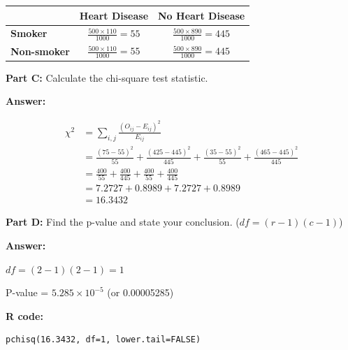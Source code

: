 \documentclass[11pt]{article}
\begin{document}
\vspace{0.3cm}

\begin{tabular}{l|cc}
& \textbf{Heart Disease} & \textbf{No Heart Disease} \\
\hline
\textbf{Smoker} & $\frac{500 \times 110}{1000} = 55$ & $\frac{500 \times 890}{1000} = 445$ \\[0.3cm]
\textbf{Non-smoker} & $\frac{500 \times 110}{1000} = 55$ & $\frac{500 \times 890}{1000} = 445$ \\
\end{tabular}

\vspace{1cm}

\textbf{Part C:} Calculate the chi-square test statistic.

\vspace{0.3cm}

\textbf{Answer:}

\begin{align*}
\chi^2 &= \sum_{i,j} \frac{(O_{ij} - E_{ij})^2}{E_{ij}} \\
&= \frac{(75-55)^2}{55} + \frac{(425-445)^2}{445} + \frac{(35-55)^2}{55} + \frac{(465-445)^2}{445} \\
&= \frac{400}{55} + \frac{400}{445} + \frac{400}{55} + \frac{400}{445} \\
&= 7.2727 + 0.8989 + 7.2727 + 0.8989 \\
&= 16.3432
\end{align*}

\vspace{0.5cm}

\textbf{Part D:} Find the p-value and state your conclusion. ($df = (r-1)(c-1)$)

\vspace{0.3cm}

\textbf{Answer:}

$df = (2-1)(2-1) = 1$

\vspace{0.3cm}

P-value = $5.285 \times 10^{-5}$ (or 0.00005285)

\vspace{0.3cm}

\textbf{R code:}
\begin{verbatim}
pchisq(16.3432, df=1, lower.tail=FALSE)
\end{verbatim}

\vspace{0.3cm}
\end{document}
